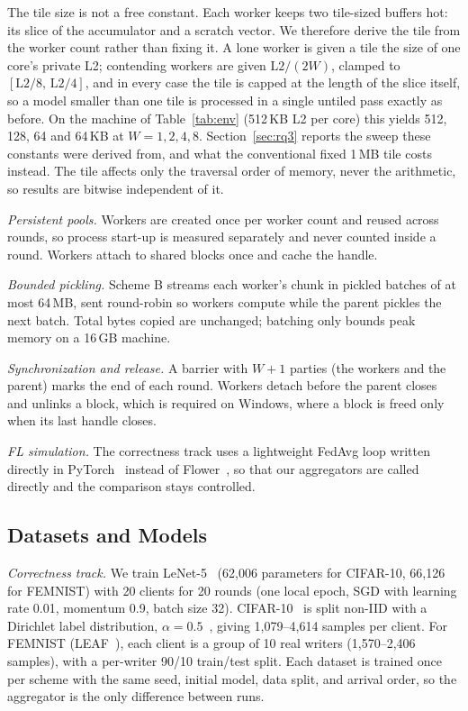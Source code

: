 \documentclass[conference]{IEEEtran}
\begin{document}
The tile size is not a free constant. Each worker keeps two tile-sized buffers hot: its slice of the accumulator and a scratch vector. We therefore derive the tile from the worker count rather than fixing it. A lone worker is given a tile the size of one core's private L2; contending workers are given $\text{L2}/(2W)$, clamped to $[\text{L2}/8,\,\text{L2}/4]$, and in every case the tile is capped at the length of the slice itself, so a model smaller than one tile is processed in a single untiled pass exactly as before. On the machine of Table~\ref{tab:env} (512\,KB L2 per core) this yields 512, 128, 64 and 64\,KB at $W=1,2,4,8$. Section~\ref{sec:rq3} reports the sweep these constants were derived from, and what the conventional fixed 1\,MB tile costs instead. The tile affects only the traversal order of memory, never the arithmetic, so results are bitwise independent of it.

\textit{Persistent pools.} Workers are created once per worker count and reused across rounds, so process start-up is measured separately and never counted inside a round. Workers attach to shared blocks once and cache the handle.

\textit{Bounded pickling.} Scheme B streams each worker's chunk in pickled batches of at most 64\,MB, sent round-robin so workers compute while the parent pickles the next batch. Total bytes copied are unchanged; batching only bounds peak memory on a 16\,GB machine.

\textit{Synchronization and release.} A barrier with $W\!+\!1$ parties (the workers and the parent) marks the end of each round. Workers detach before the parent closes and unlinks a block, which is required on Windows, where a block is freed only when its last handle closes.

\textit{FL simulation.} The correctness track uses a lightweight FedAvg loop written directly in PyTorch~\cite{pytorch} instead of Flower~\cite{flower}, so that our aggregators are called directly and the comparison stays controlled.

\subsection{Datasets and Models}
\textit{Correctness track.} We train LeNet-5~\cite{lenet} (62,006 parameters for CIFAR-10, 66,126 for FEMNIST) with 20 clients for 20 rounds (one local epoch, SGD with learning rate 0.01, momentum 0.9, batch size 32). CIFAR-10~\cite{cifar} is split non-IID with a Dirichlet label distribution, $\alpha=0.5$~\cite{hsu2019}, giving 1,079--4,614 samples per client. For FEMNIST (LEAF~\cite{leaf}), each client is a group of 10 real writers (1,570--2,406 samples), with a per-writer 90/10 train/test split. Each dataset is trained once per scheme with the same seed, initial model, data split, and arrival order, so the aggregator is the only difference between runs.
\end{document}
